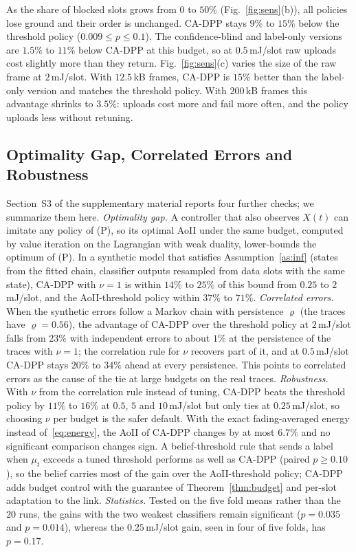\documentclass[10pt,journal,compsoc]{IEEEtran}
\theoremstyle{remark}
\begin{document}
As the share of blocked slots grows from $0$ to $50\%$ (Fig.~\ref{fig:sens}(b)), all policies lose ground and their order is unchanged. CA-DPP stays $9\%$ to $15\%$ below the threshold policy ($0.009\le p\le0.1$). The confidence-blind and label-only versions are $1.5\%$ to $11\%$ below CA-DPP at this budget, so at $0.5$\,mJ/slot raw uploads cost slightly more than they return. Fig.~\ref{fig:sens}(c) varies the size of the raw frame at $2$\,mJ/slot. With $12.5$\,kB frames, CA-DPP is $15\%$ better than the label-only version and matches the threshold policy. With $200$\,kB frames this advantage shrinks to $3.5\%$: uploads cost more and fail more often, and the policy uploads less without retuning.


\subsection{Optimality Gap, Correlated Errors and Robustness}\label{res:extra}
Section~S3 of the supplementary material reports four further checks; we summarize them here. \emph{Optimality gap.} A controller that also observes $X(t)$ can imitate any policy of (P), so its optimal AoII under the same budget, computed by value iteration on the Lagrangian with weak duality, lower-bounds the optimum of (P). In a synthetic model that satisfies Assumption~\ref{as:inf} (states from the fitted chain, classifier outputs resampled from data slots with the same state), CA-DPP with $\nu=1$ is within $14\%$ to $25\%$ of this bound from $0.25$ to $2$\,mJ/slot, and the AoII-threshold policy within $37\%$ to $71\%$. \emph{Correlated errors.} When the synthetic errors follow a Markov chain with persistence $\varrho$ (the traces have $\varrho=0.56$), the advantage of CA-DPP over the threshold policy at $2$\,mJ/slot falls from $23\%$ with independent errors to about $1\%$ at the persistence of the traces with $\nu=1$; the correlation rule for $\nu$ recovers part of it, and at $0.5$\,mJ/slot CA-DPP stays $20\%$ to $34\%$ ahead at every persistence. This points to correlated errors as the cause of the tie at large budgets on the real traces. \emph{Robustness.} With $\nu$ from the correlation rule instead of tuning, CA-DPP beats the threshold policy by $11\%$ to $16\%$ at $0.5$, $5$ and $10$\,mJ/slot but only ties at $0.25$\,mJ/slot, so choosing $\nu$ per budget is the safer default. With the exact fading-averaged energy instead of~\eqref{eq:energy}, the AoII of CA-DPP changes by at most $6.7\%$ and no significant comparison changes sign. A belief-threshold rule that sends a label when $\mu_t$ exceeds a tuned threshold performs as well as CA-DPP (paired $p\ge0.10$), so the belief carries most of the gain over the AoII-threshold policy; CA-DPP adds budget control with the guarantee of Theorem~\ref{thm:budget} and per-slot adaptation to the link. \emph{Statistics.} Tested on the five fold means rather than the $20$ runs, the gains with the two weakest classifiers remain significant ($p=0.035$ and $p=0.014$), whereas the $0.25$\,mJ/slot gain, seen in four of five folds, has $p=0.17$.
\end{document}
